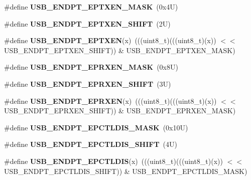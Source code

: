 \begin{DoxyCompactItemize}
\#define {\bfseries U\+S\+B\+\_\+\+E\+N\+D\+P\+T\+\_\+\+E\+P\+T\+X\+E\+N\+\_\+\+M\+A\+SK}~(0x4\+U)
\item 
\mbox{\label{group___u_s_b___register___masks_gad281aa3cd601a2a93f60e0145dd8e564}} 
\#define {\bfseries U\+S\+B\+\_\+\+E\+N\+D\+P\+T\+\_\+\+E\+P\+T\+X\+E\+N\+\_\+\+S\+H\+I\+FT}~(2\+U)
\item 
\mbox{\label{group___u_s_b___register___masks_gae2e26d86dd1195cd8536e873faa1c5e7}} 
\#define {\bfseries U\+S\+B\+\_\+\+E\+N\+D\+P\+T\+\_\+\+E\+P\+T\+X\+EN}(x)~(((uint8\+\_\+t)(((uint8\+\_\+t)(x)) $<$$<$ U\+S\+B\+\_\+\+E\+N\+D\+P\+T\+\_\+\+E\+P\+T\+X\+E\+N\+\_\+\+S\+H\+I\+FT)) \& U\+S\+B\+\_\+\+E\+N\+D\+P\+T\+\_\+\+E\+P\+T\+X\+E\+N\+\_\+\+M\+A\+SK)
\item 
\mbox{\label{group___u_s_b___register___masks_ga80f33455bd11aa0be5cd5d876ab48228}} 
\#define {\bfseries U\+S\+B\+\_\+\+E\+N\+D\+P\+T\+\_\+\+E\+P\+R\+X\+E\+N\+\_\+\+M\+A\+SK}~(0x8\+U)
\item 
\mbox{\label{group___u_s_b___register___masks_gaeba041e492aca9bfbdbc90584e00cba9}} 
\#define {\bfseries U\+S\+B\+\_\+\+E\+N\+D\+P\+T\+\_\+\+E\+P\+R\+X\+E\+N\+\_\+\+S\+H\+I\+FT}~(3\+U)
\item 
\mbox{\label{group___u_s_b___register___masks_ga88daead6b23836beafb0da6aead51fac}} 
\#define {\bfseries U\+S\+B\+\_\+\+E\+N\+D\+P\+T\+\_\+\+E\+P\+R\+X\+EN}(x)~(((uint8\+\_\+t)(((uint8\+\_\+t)(x)) $<$$<$ U\+S\+B\+\_\+\+E\+N\+D\+P\+T\+\_\+\+E\+P\+R\+X\+E\+N\+\_\+\+S\+H\+I\+FT)) \& U\+S\+B\+\_\+\+E\+N\+D\+P\+T\+\_\+\+E\+P\+R\+X\+E\+N\+\_\+\+M\+A\+SK)
\item 
\mbox{\label{group___u_s_b___register___masks_ga07f43f2be7e974a763e86087f47e14d6}} 
\#define {\bfseries U\+S\+B\+\_\+\+E\+N\+D\+P\+T\+\_\+\+E\+P\+C\+T\+L\+D\+I\+S\+\_\+\+M\+A\+SK}~(0x10\+U)
\item 
\mbox{\label{group___u_s_b___register___masks_ga0607b1ed419fd16c0c3635042ff33fd4}} 
\#define {\bfseries U\+S\+B\+\_\+\+E\+N\+D\+P\+T\+\_\+\+E\+P\+C\+T\+L\+D\+I\+S\+\_\+\+S\+H\+I\+FT}~(4\+U)
\item 
\mbox{\label{group___u_s_b___register___masks_gacf7f8e35ddc1367ac4069ef47ccdd448}} 
\#define {\bfseries U\+S\+B\+\_\+\+E\+N\+D\+P\+T\+\_\+\+E\+P\+C\+T\+L\+D\+IS}(x)~(((uint8\+\_\+t)(((uint8\+\_\+t)(x)) $<$$<$ U\+S\+B\+\_\+\+E\+N\+D\+P\+T\+\_\+\+E\+P\+C\+T\+L\+D\+I\+S\+\_\+\+S\+H\+I\+FT)) \& U\+S\+B\+\_\+\+E\+N\+D\+P\+T\+\_\+\+E\+P\+C\+T\+L\+D\+I\+S\+\_\+\+M\+A\+SK)
\end{DoxyCompactItemize}
